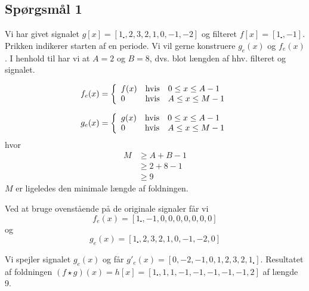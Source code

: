 \documentclass[a4paper, 10pt, danish, final]{article}
\title{\mytitle}
\subtitle{\mysubtitle}
\author{\myauthor{} - \mymail}
\date{\mydate}
\begin{document}
\maketitle

\subsection*{Spørgsmål 1}
Vi har givet signalet $g[x]=[1_{\centerdot}, 2, 3, 2, 1, 0, -1, -2]$ og
filteret $f[x]=[1_{\centerdot}, -1]$. Prikken indikerer starten af en
periode. Vi vil gerne konstruere $g_e(x)$ og $f_e(x)$. I henhold til
\citep[s. 15]{soereninout} har vi at $A = 2$ og $B = 8$, dvs. blot
længden af hhv. filteret og signalet.

\begin{equation}
    f_e(x) = \left\{ \begin{array}{l l l}
        f(x) & \mbox{hvis} & 0 \leq x \leq A - 1\\
        0 & \mbox{hvis} & A \leq x \leq M - 1
    \end{array}\right.
\end{equation}

\begin{equation}
    g_e(x) = \left\{ \begin{array}{l l l}
        g(x) & \mbox{hvis} & 0 \leq x \leq A - 1\\
        0 & \mbox{hvis} & A \leq x \leq M - 1
    \end{array}\right.
\end{equation}
hvor
\begin{align}
    M & \geq A + B - 1\nonumber\\
    & \geq  2 + 8 - 1\\
    & \geq  9\nonumber
\end{align}
$M$ er ligeledes den minimale længde af foldningen.

Ved at bruge ovenstående på de originale signaler får vi
\begin{equation}
    f_e(x) = [1_{\centerdot}, -1, 0, 0, 0, 0, 0, 0, 0]
\end{equation}
og
\begin{equation}
    g_e(x) = [1_{\centerdot}, 2, 3, 2, 1, 0, -1, -2, 0]
\end{equation}

Vi spejler signalet $g_e(x)$ og får $g'_e(x) = [0, -2, -1, 0, 1, 2, 3,
2, 1_{\centerdot}]$. Resultatet af foldningen $(f \star g)(x) = h[x] =
[1_\centerdot, 1, 1, -1, -1, -1, -1, -1, 2]$ af længde 9.
\end{document}
